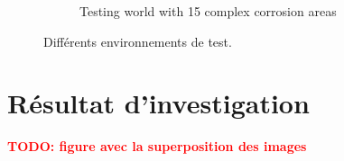 \documentclass[francais,RandD]{rapportPFE}
\newcommand{\TODO}[1]{\textcolor{red}{\textbf{TODO: #1}}}
\begin{document}
\begin{figure}[H]
\begin{subfigure}[t]{0.15\linewidth}
				\caption{Testing world with 15 complex corrosion areas}
				\label{fig:test_model_15_complex_1}
			\end{subfigure}
			\caption{Différents environnements de test.}
			\label{fig:test_models}
		\end{figure}
	\section{Résultat d'investigation}
		\label{annexe:resultat}
		\TODO{figure avec la superposition des images}
\end{document}
